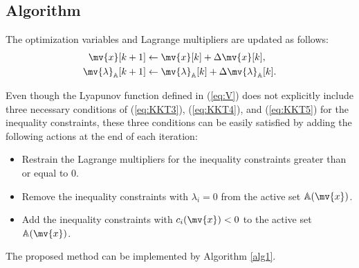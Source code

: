 \documentclass[journal]{IEEEtranTIE}
\newtheorem{lemma}{Lemma}
\newcommand{\CHHA}[1]{{\color{red} [CH: #1]}} %
\begin{document}


\subsection{Algorithm}\label{subsec:algo}

The optimization variables and Lagrange multipliers are updated as follows:
\begin{subequations}
\begin{align}
 \mv{x}[k + 1] &\leftarrow \mv{x}[k] + \Delta\mv{x}[k],\\
 \mv{\lambda}_{\mathbb{A}}[k + 1] &\leftarrow {\mv{\lambda}_{\mathbb{A}}}[k] + \Delta\mv{\lambda}_{\mathbb{A}}[k].
\end{align}
\end{subequations}

Even though the Lyapunov function defined in (\ref{eq:V}) does not explicitly include three necessary conditions of (\ref{eq:KKT3}), (\ref{eq:KKT4}), and (\ref{eq:KKT5}) for the inequality constraints, these three conditions can be easily satisfied by adding the following actions at the end of each iteration: %
\begin{itemize}
    \item Restrain the Lagrange multipliers for the inequality constraints greater than or equal to 0. 
    \item Remove the inequality constraints with $\lambda_i = 0$ from the active set $\mathbb{A}(\mv{x})$.
    \item Add the inequality constraints with $c_i(\mv{x}) < 0$ to the active set $\mathbb{A}(\mv{x})$. %
\end{itemize}

The proposed method can be implemented by Algorithm \ref{alg1}. 

\end{document}
